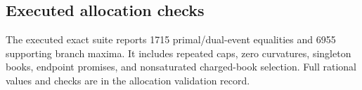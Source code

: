 \subsection{Executed allocation checks}
The executed exact suite reports 1715 primal/dual-event equalities and 6955 supporting branch maxima. It includes repeated caps, zero curvatures, singleton books, endpoint promises, and nonsaturated charged-book selection. Full rational values and checks are in the allocation validation record.
